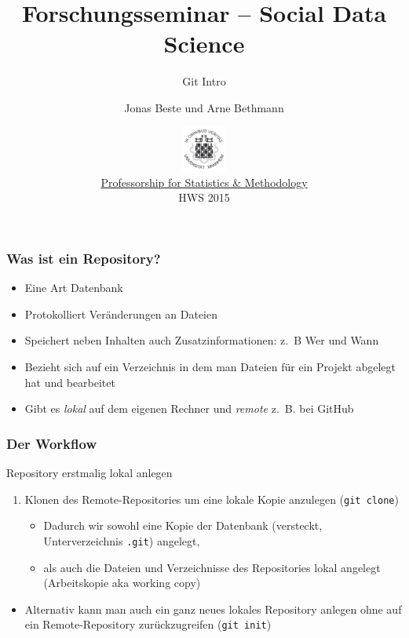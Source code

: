 \documentclass{beamer}
\title{Forschungsseminar -- Social Data Science}
\subtitle{Git Intro}
\author[Beste \& Bethmann]{Jonas Beste und Arne Bethmann}
\date{\includegraphics[height=1.5cm]{150px-Uni_Mannheim_Siegel.png} \\
  \href{http://sswml.uni-mannheim.de/}{Professorship for Statistics \& Methodology} \\
  HWS 2015}
\begin{document}
\begin{frame}
  \titlepage
\end{frame}


\begin{frame}
  \frametitle{Was ist ein Repository?}
  \begin{itemize}
    \item Eine Art Datenbank
    \item Protokolliert Veränderungen an Dateien
    \item Speichert neben Inhalten auch Zusatzinformationen: z.~B Wer und Wann
    \item Bezieht sich auf ein Verzeichnis in dem man Dateien für ein Projekt abgelegt hat und bearbeitet
    \item Gibt es \emph{lokal} auf dem eigenen Rechner und \emph{remote} z.~B. bei GitHub
  \end{itemize}
\end{frame}


\begin{frame}
  \frametitle{Der Workflow}
  \begin{block}{Repository erstmalig lokal anlegen}
  \begin{enumerate}
    \item Klonen des Remote-Repositories um eine lokale Kopie anzulegen (\texttt{git clone})
    \begin{itemize}
    \item Dadurch wir sowohl eine Kopie der Datenbank (versteckt, Unterverzeichnis \texttt{.git}) angelegt,
    \item als auch die Dateien und Verzeichnisse des Repositories lokal angelegt (Arbeitskopie aka working copy)
    \end{itemize}
  \end{enumerate}
  \begin{itemize}
  \item Alternativ kann man auch ein ganz neues lokales Repository anlegen ohne auf ein Remote-Repository zurückzugreifen (\texttt{git init})
  \end{itemize}
  \end{block}
\end{frame}
\end{document}
